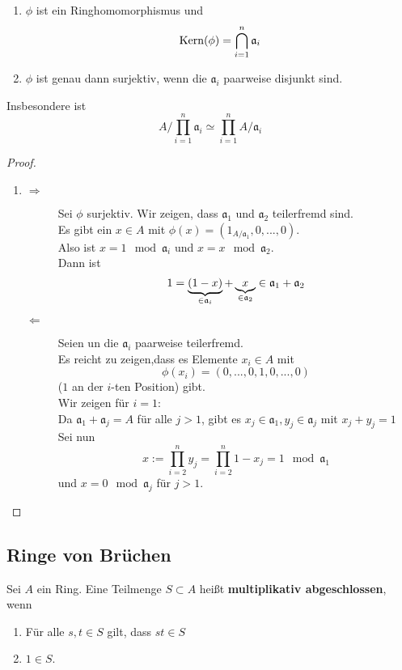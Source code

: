 	\begin{prop}
		\begin{enumerate}
			\item $\phi$ ist ein Ringhomomorphismus und
			\[\operatorname{Kern}(\phi)=\bigcap_{i=1}^n\mathfrak a_i\]
			\item $\phi$ ist genau dann surjektiv, wenn die $\mathfrak a_i$ paarweise disjunkt sind.
		\end{enumerate}
		Insbesondere ist
		\[A/\prod_{i=1}^n\mathfrak a_i\simeq \prod_{i=1}^nA/\mathfrak a_i\]
	\end{prop}
	\begin{proof}
		\begin{enumerate}
			\item \begin{description}
				\item[$\Rightarrow$] Sei $\phi$ surjektiv. Wir zeigen, dass $\mathfrak a_1$ und $\mathfrak a_2$ teilerfremd sind.\\
				Es gibt ein $x\in A$ mit $\phi(x)=(1_{A/\mathfrak a_1},0,...,0)$.\\
				Also ist $x=1\mod \mathfrak a_i$ und $x=x\mod \mathfrak a_2$.\\
				Dann ist
				\[1=\underbrace{(1-x)}_{\in\mathfrak a_i}+\underbrace{x}_{\mathclap{\in\mathfrak a_2}}\in \mathfrak a_1+\mathfrak a_2\]
				\item[$\Leftarrow$] Seien un die $\mathfrak a_i$ paarweise teilerfremd.\\
				Es reicht zu zeigen,dass es Elemente $x_i\in A$ mit
				\[\phi(x_i)=(0,...,0,1,0,...,0)\]
				($1$ an der $i$-ten Position) gibt.\\
				Wir zeigen für $i=1$:\\
				Da $\mathfrak a_1+\mathfrak a_j=A$ für alle $j>1$, gibt es $x_j\in \mathfrak a_1, y_j\in\mathfrak a_j$ mit $x_j+y_j=1$\\
				Sei nun
				\[x:=\prod_{i=2}^ny_j=\prod_{i=2}^n1-x_j=1\mod\mathfrak a_1\]
				und $x=0\mod\mathfrak a_j$ für $j>1$.
			\end{description}
		\end{enumerate}
	\end{proof}
	
	\subsection{Ringe von Brüchen}
	\begin{definition}
		Sei $A$ ein Ring. Eine Teilmenge $S\subset A$ heißt \textbf{multiplikativ abgeschlossen}, wenn
		\begin{enumerate}
			\item Für alle $s,t\in S$ gilt, dass $st\in S$
			\item $1\in S$.
		\end{enumerate}
	\end{definition}

